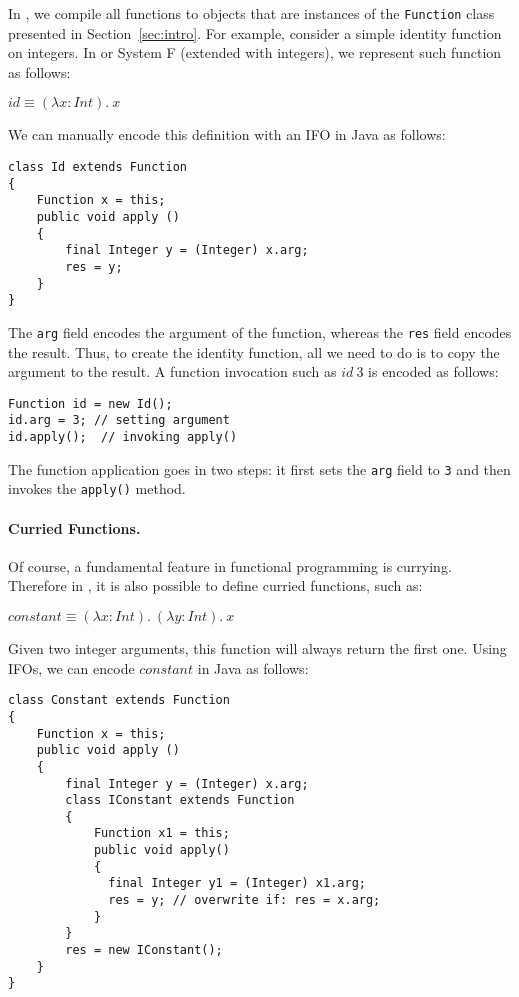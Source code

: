 \noindent In \Name, we compile all functions to objects that are
instances of the \lstinline{Function} class presented in 
Section~\ref{sec:intro}. For example, consider a simple identity
function on integers. In \name or System F (extended with integers),
we represent such function as follows:

\vspace{5pt}
$id \equiv (\lambda x : Int).~x$
\vspace{5pt}

\noindent We can manually encode this definition with an IFO in Java as follows: 

\begin{lstlisting}
class Id extends Function
{
    Function x = this;
    public void apply ()
    {
        final Integer y = (Integer) x.arg;
        res = y;
    }
}
\end{lstlisting}

\noindent The \lstinline{arg} field encodes the argument of the
function, whereas the \lstinline{res} field encodes the result. Thus, 
to create the identity function, all we need to do is to copy the
argument to the result. A function invocation such as 
$id~3$ is encoded as follows:

\begin{lstlisting}
Function id = new Id();
id.arg = 3; // setting argument
id.apply();  // invoking apply()
\end{lstlisting}

\noindent The function application goes in two steps:
it first sets the \lstinline{arg} field to \lstinline{3} and then 
invokes the \lstinline{apply()} method. 

\paragraph{Curried Functions.} Of course, a 
fundamental feature in functional programming is currying. 
Therefore in \Name, it is also possible to define 
curried functions, such as:

\vspace{5pt}
$constant \equiv (\lambda x : Int) .~(\lambda y : Int) .~x$
\vspace{5pt}

\noindent Given two integer arguments, this function will always return
the first one. Using IFOs, we can encode $constant$ in Java as follows:

\begin{lstlisting}
class Constant extends Function
{
    Function x = this;
    public void apply ()
    {
        final Integer y = (Integer) x.arg;
        class IConstant extends Function
        {
            Function x1 = this;
            public void apply()
            {
              final Integer y1 = (Integer) x1.arg;
              res = y; // overwrite if: res = x.arg;
            }
        }
        res = new IConstant();
    }
}
\end{lstlisting}

